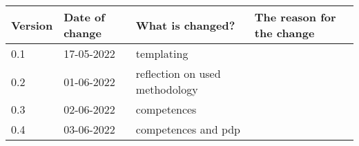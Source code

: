 \begin{tabular}{ | l | l | l | l |}
    \hline
    \textbf{Version} & \textbf{Date of change} & \textbf{What is changed?} & \textbf{The reason for the change} \\ \hline
    0.1 & 17-05-2022 & templating & \\
    0.2 & 01-06-2022 & reflection on used methodology & \\
    0.3 & 02-06-2022 & competences & \\
    0.4 & 03-06-2022 & competences and pdp &
    \hline
\end{tabular}